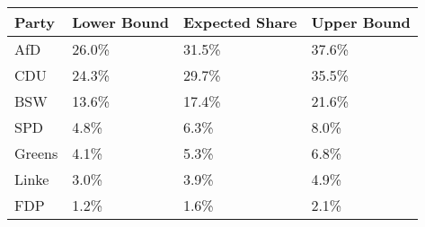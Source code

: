 \begin{tabular}{llll}
  \hline
Party & Lower Bound & Expected Share & Upper Bound \\ 
  \hline
AfD & 26.0\% & 31.5\% & 37.6\% \\ 
  CDU & 24.3\% & 29.7\% & 35.5\% \\ 
  BSW & 13.6\% & 17.4\% & 21.6\% \\ 
  SPD & 4.8\% & 6.3\% & 8.0\% \\ 
  Greens & 4.1\% & 5.3\% & 6.8\% \\ 
  Linke & 3.0\% & 3.9\% & 4.9\% \\ 
  FDP & 1.2\% & 1.6\% & 2.1\% \\ 
   \hline
\end{tabular}

